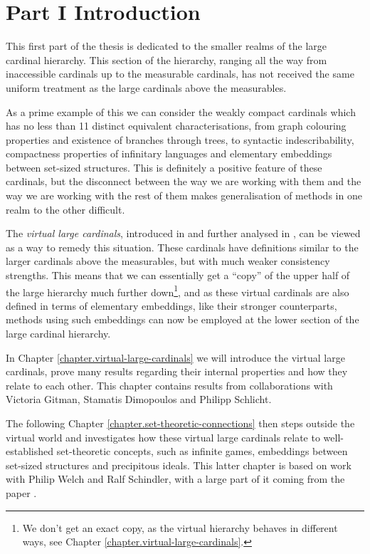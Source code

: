 \documentclass[../../main]{subfiles}
\begin{document}
\chapter{Part I Introduction}
\thispagestyle{fancy}

This first part of the thesis is dedicated to the smaller realms of the large cardinal hierarchy. This section of the hierarchy, ranging all the way from inaccessible cardinals up to the measurable cardinals, has not received the same uniform treatment as the large cardinals above the measurables. 

\qquad As a prime example of this we can consider the weakly compact cardinals which has no less than 11 distinct equivalent characterisations, from graph colouring properties and existence of branches through trees, to syntactic indescribability, compactness properties of infinitary languages and elementary embeddings between set-sized structures. This is definitely a positive feature of these cardinals, but the disconnect between the way we are working with them and the way we are working with the rest of them makes generalisation of methods in one realm to the other difficult.

\qquad The \textit{virtual large cardinals}, introduced in \cite{remarkable} and further analysed in \cite{GitmanSchindler}, can be viewed as a way to remedy this situation. These cardinals have definitions similar to the larger cardinals above the measurables, but with much weaker consistency strengths. This means that we can essentially get a ``copy'' of the upper half of the large hierarchy much further down\footnote{We don't get an exact copy, as the virtual hierarchy behaves in different ways, see Chapter \ref{chapter.virtual-large-cardinals}.}, and as these virtual cardinals are also defined in terms of elementary embeddings, like their stronger counterparts, methods using such embeddings can now be employed at the lower section of the large cardinal hierarchy.

\qquad In Chapter \ref{chapter.virtual-large-cardinals} we will introduce the virtual large cardinals, prove many results regarding their internal properties and how they relate to each other. This chapter contains results from collaborations with Victoria Gitman, Stamatis Dimopoulos and Philipp Schlicht.

\qquad The following Chapter \ref{chapter.set-theoretic-connections} then steps outside the virtual world and investigates how these virtual large cardinals relate to well-established set-theoretic concepts, such as infinite games, embeddings between set-sized structures and precipitous ideals. This latter chapter is based on work with Philip Welch and Ralf Schindler, with a large part of it coming from the paper \cite{NielsenWelch}.
\end{document}
